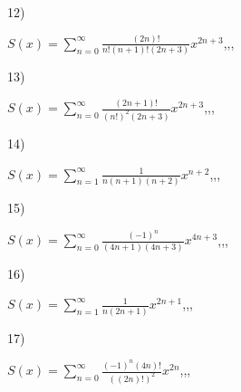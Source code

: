 \documentclass[11pt, ukrainian]{article}
\begin{document}
\par
\vspace{0.9cm}
12) \space 
{%
{$S(x)=\sum\limits_{n=0}^{\infty}{\frac{(2n)!}{n!(n+1)!(2n+3)}}{x^{{2n+3}}}$},,, \par \smallskip  
}
\par
\vspace{0.9cm}
13) \space 
{%
{$S(x)=\sum\limits_{n=0}^{\infty}{\frac{(2n+1)!}{(n!)^2(2n+3)}}{x^{{2n+3}}}$},,, \par \smallskip  
}
\par
\vspace{0.9cm}
14) \space 
{%
{$S(x)=\sum\limits_{n=1}^{\infty}{\frac{1}{n(n+1)(n+2)}}{x^{{n+2}}}$},,, \par \smallskip  
}
\par
\vspace{0.9cm}
15) \space 
{%
{$S(x)=\sum\limits_{n=0}^{\infty}{\frac{(-1)^n}{(4n+1)(4n+3)}}{x^{{4n+3}}}$},,, \par \smallskip  
}
\par
\vspace{0.9cm}
16) \space 
{%
{$S(x)=\sum\limits_{n=1}^{\infty}{\frac{1}{n(2n+1)}}{x^{{2n+1}}}$},,, \par \smallskip  
}
\par
\vspace{0.9cm}
17) \space 
{%
{$S(x)=\sum\limits_{n=0}^{\infty}{\frac{{(-1)^n}(4n)!}{{((2n)!)^2}}}{x^{{2n}}}$},,, \par \smallskip  
}
\end{document}
